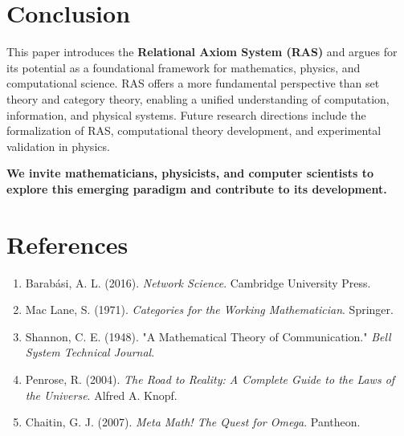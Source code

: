 \documentclass[a4paper,12pt]{article}
\begin{document}
\section{Conclusion}
This paper introduces the \textbf{Relational Axiom System (RAS)} and argues for its potential as a foundational framework for mathematics, physics, and computational science. RAS offers a more fundamental perspective than set theory and category theory, enabling a unified understanding of computation, information, and physical systems. Future research directions include the formalization of RAS, computational theory development, and experimental validation in physics.

\textbf{We invite mathematicians, physicists, and computer scientists to explore this emerging paradigm and contribute to its development.}

\section{References}
\begin{enumerate}
    \item Barabási, A. L. (2016). \textit{Network Science}. Cambridge University Press.
    \item Mac Lane, S. (1971). \textit{Categories for the Working Mathematician}. Springer.
    \item Shannon, C. E. (1948). "A Mathematical Theory of Communication." \textit{Bell System Technical Journal}.
    \item Penrose, R. (2004). \textit{The Road to Reality: A Complete Guide to the Laws of the Universe}. Alfred A. Knopf.
    \item Chaitin, G. J. (2007). \textit{Meta Math! The Quest for Omega}. Pantheon.
\end{enumerate}
\end{document}
